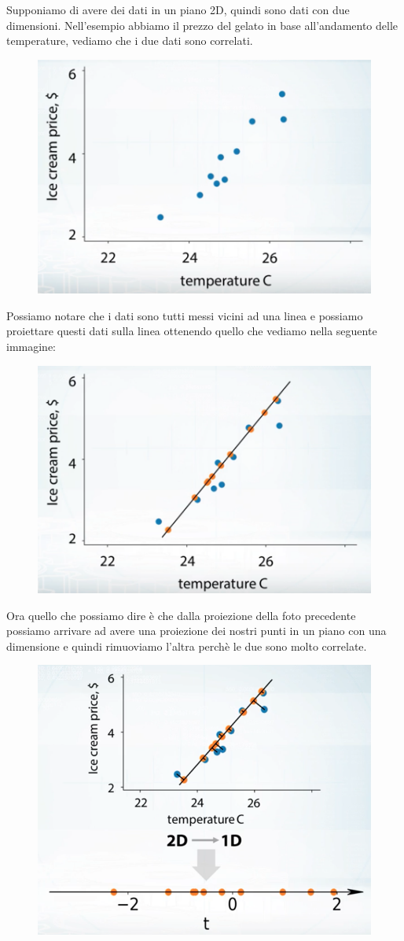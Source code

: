 \documentclass[14pt]{extreport}
\begin{document}
Supponiamo di avere dei dati in un piano 2D, quindi sono dati con due dimensioni.
Nell'esempio abbiamo il prezzo del gelato in base all'andamento delle temperature, vediamo che i due dati sono correlati.

\begin{figure}[H]
\centering
\includegraphics[width=0.7\linewidth]{571.jpeg}
\end{figure}

Possiamo notare che i dati sono tutti messi vicini ad una linea e possiamo proiettare questi dati sulla linea ottenendo quello che 
vediamo nella seguente immagine:

\begin{figure}[H]
\centering
\includegraphics[width=0.7\linewidth]{572.jpeg}
\end{figure}

Ora quello che possiamo dire è che dalla proiezione della foto precedente possiamo arrivare ad avere una proiezione 
dei nostri punti in un piano con una dimensione e quindi rimuoviamo l'altra perchè le due sono molto correlate.

\begin{figure}[H]
\centering
\includegraphics[width=0.7\linewidth]{573.jpeg}
\end{figure}
\end{document}
